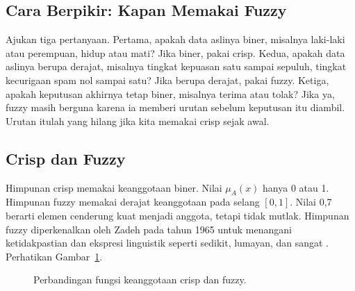 \documentclass[11pt,a4paper]{article}
\begin{document}
\subsection{Cara Berpikir: Kapan Memakai Fuzzy}

Ajukan tiga pertanyaan. Pertama, apakah data aslinya biner, misalnya laki-laki atau perempuan, hidup atau mati? Jika biner, pakai crisp. Kedua, apakah data aslinya berupa derajat, misalnya tingkat kepuasan satu sampai sepuluh, tingkat kecurigaan spam nol sampai satu? Jika berupa derajat, pakai fuzzy. Ketiga, apakah keputusan akhirnya tetap biner, misalnya terima atau tolak? Jika ya, fuzzy masih berguna karena ia memberi urutan sebelum keputusan itu diambil. Urutan itulah yang hilang jika kita memakai crisp sejak awal.

\subsection{Crisp dan Fuzzy}

Himpunan crisp memakai keanggotaan biner. Nilai $\mu_A(x)$ hanya 0 atau 1. Himpunan fuzzy memakai derajat keanggotaan pada selang $[0,1]$. Nilai 0,7 berarti elemen cenderung kuat menjadi anggota, tetapi tidak mutlak. Himpunan fuzzy diperkenalkan oleh Zadeh pada tahun 1965 untuk menangani ketidakpastian dan ekspresi linguistik seperti sedikit, lumayan, dan sangat \cite{zadeh}. Perhatikan Gambar~\ref{fig:crisp-fuzzy}.

\begin{figure}[H]
	\centering
	\caption{Perbandingan fungsi keanggotaan crisp dan fuzzy.}
	\label{fig:crisp-fuzzy}
\end{figure}
\end{document}
